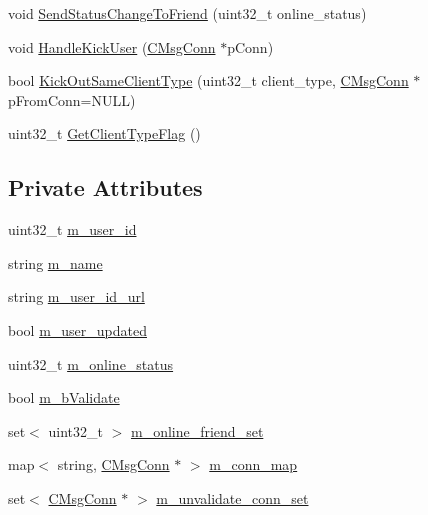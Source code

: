\begin{DoxyCompactItemize}
\item 
void \hyperlink{class_c_im_user_af925f321d5aecd689a66e33b09381bb6}{Send\+Status\+Change\+To\+Friend} (uint32\+\_\+t online\+\_\+status)
\item 
void \hyperlink{class_c_im_user_ab83c9e4a8ce53b5dcdd5fdf9992731f2}{Handle\+Kick\+User} (\hyperlink{class_c_msg_conn}{C\+Msg\+Conn} $\ast$p\+Conn)
\item 
bool \hyperlink{class_c_im_user_a2956c7f09b3b038c78d5a0d91d1cbf52}{Kick\+Out\+Same\+Client\+Type} (uint32\+\_\+t client\+\_\+type, \hyperlink{class_c_msg_conn}{C\+Msg\+Conn} $\ast$p\+From\+Conn=N\+U\+L\+L)
\item 
uint32\+\_\+t \hyperlink{class_c_im_user_ae6c60a356658285eaebb9b87eefcaf7a}{Get\+Client\+Type\+Flag} ()
\end{DoxyCompactItemize}
\subsection*{Private Attributes}
\begin{DoxyCompactItemize}
\item 
uint32\+\_\+t \hyperlink{class_c_im_user_ac7d7ab690332742b6449fe2a44ddb169}{m\+\_\+user\+\_\+id}
\item 
string \hyperlink{class_c_im_user_aef92598f3b317d4ae87079a747e62fed}{m\+\_\+name}
\item 
string \hyperlink{class_c_im_user_af4be2861d6f8d64ec714b7ac2935d851}{m\+\_\+user\+\_\+id\+\_\+url}
\item 
bool \hyperlink{class_c_im_user_a716381ad5f004a8f37a42338fcc72ed1}{m\+\_\+user\+\_\+updated}
\item 
uint32\+\_\+t \hyperlink{class_c_im_user_a9299f89e2823da61840f0ef29029c437}{m\+\_\+online\+\_\+status}
\item 
bool \hyperlink{class_c_im_user_aa7b139963099d84cb6eb87da736fb0ff}{m\+\_\+b\+Validate}
\item 
set$<$ uint32\+\_\+t $>$ \hyperlink{class_c_im_user_a61c057a907afc1d34886ddc68ddf3fb2}{m\+\_\+online\+\_\+friend\+\_\+set}
\item 
map$<$ string, \hyperlink{class_c_msg_conn}{C\+Msg\+Conn} $\ast$ $>$ \hyperlink{class_c_im_user_a35fda14e1d68dea33e4cbdea085f6ca9}{m\+\_\+conn\+\_\+map}
\item 
set$<$ \hyperlink{class_c_msg_conn}{C\+Msg\+Conn} $\ast$ $>$ \hyperlink{class_c_im_user_a9ae79e460f744bd2be1672e084e7eeb8}{m\+\_\+unvalidate\+\_\+conn\+\_\+set}
\end{DoxyCompactItemize}


